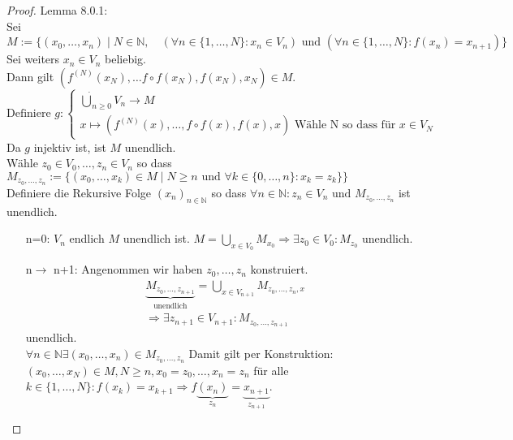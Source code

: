 \begin{proof}{Lemma 8.0.1:}\\
    Sei 
    $$
    M:=\{(x_0,\dots,x_n)\mid N \in \mathbb{N}, \quad (\forall n \in \{1,\dots, N\}: x_n \in V_n )
    \text{ und } (\forall n \in \{1,\dots, N\}: f(x_n) = x_{n+1})\}
    $$
    Sei weiters $x_n \in V_n$ beliebig. \\
    Dann gilt $(f^{(N)}(x_N),\dots f \circ f (x_N), f(x_N), x_N) \in M$.
    $$
    \text{Definiere } g: 
    \begin{cases}
    \dot{\bigcup}_{n\geq 0} V_n \to M \\
    x \mapsto (f^{(N)}(x),\dots, f \circ f (x), f(x), x) \text{ Wähle N so dass für } x \in V_N
    \end{cases}
    $$
    Da $g$ injektiv ist, ist $M$ unendlich.\\
    Wähle  $z_0 \in V_0, \dots, z_n \in V_n$ so dass 
    $M_{z_0,\dots,z_n} := \{(x_0,\dots,x_k) \in M \mid N \geq n \text{ und } 
    \forall k \in \{0,\dots,n\}: x_k = z_k\}\}$\\
    Definiere die Rekursive Folge $(x_n)_{n \in \mathbb{N}}$ 
    so dass $\forall n \in \mathbb{N}: z_n \in V_n \text{ und } M_{z_0,\dots,z_n}$ ist unendlich.
    \begin{itemize}
        \item[n=0:] $V_n$ endlich $M$ unendlich ist. 
        $M=\bigcup_{x \in V_0} M_{x_0}\Rightarrow \exists z_0 \in V_0: M_{z_0}$ unendlich.
        \item[n$\to$ n+1:] Angenommen wir haben $z_0,\dots,z_n$ konstruiert.\\
        \begin{equation*}
        \begin{split}
        &\underbrace{M_{z_0,\dots,z_{n+1}}}_{\text{unendlich}} 
        = \bigcup_{x \in V_{n+1}} M_{z_0,\dots,z_n,x}\\
        &\Rightarrow \exists z_{n+1} \in V_{n+1}: M_{z_0,\dots,z_{n+1}}
        \end{split}
        \end{equation*}
        unendlich.\\
        $\forall n \in \mathbb{N} \exists (x_0,\dots,x_n) \in M_{z_0,\dots,z_n}$
        Damit gilt per Konstruktion: $(x_0,\dots,x_N) \in M, N \geq n, x_0 = z_0,\dots,x_n = z_n$
        für alle $k \in \{1,\dots,N\}:  f(x_k) = x_{k+1} 
        \Rightarrow f\underbrace{(x_n)}_{z_n} = \underbrace{x_{n+1}}_{z_{n+1}}$.
    \end{itemize}
\end{proof}

